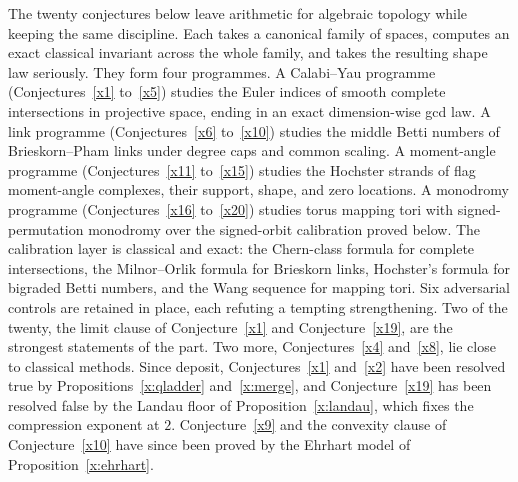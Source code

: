 \documentclass[11pt]{article}
\theoremstyle{definition}
\begin{document}
The twenty conjectures below leave arithmetic for algebraic topology while keeping the same discipline.  Each takes a canonical family of spaces, computes an exact classical invariant across the whole family, and takes the resulting shape law seriously.  They form four programmes.  A Calabi--Yau programme (Conjectures~\ref{x1} to~\ref{x5}) studies the Euler indices of smooth complete intersections in projective space, ending in an exact dimension-wise gcd law.  A link programme (Conjectures~\ref{x6} to~\ref{x10}) studies the middle Betti numbers of Brieskorn--Pham links under degree caps and common scaling.  A moment-angle programme (Conjectures~\ref{x11} to~\ref{x15}) studies the Hochster strands of flag moment-angle complexes, their support, shape, and zero locations.  A monodromy programme (Conjectures~\ref{x16} to~\ref{x20}) studies torus mapping tori with signed-permutation monodromy over the signed-orbit calibration proved below.  The calibration layer is classical and exact: the Chern-class formula for complete intersections, the Milnor--Orlik formula for Brieskorn links, Hochster's formula for bigraded Betti numbers, and the Wang sequence for mapping tori.  Six adversarial controls are retained in place, each refuting a tempting strengthening.  Two of the twenty, the limit clause of Conjecture~\ref{x1} and Conjecture~\ref{x19}, are the strongest statements of the part.  Two more, Conjectures~\ref{x4} and~\ref{x8}, lie close to classical methods.  Since deposit, Conjectures~\ref{x1} and~\ref{x2} have been resolved true by Propositions~\ref{x:qladder} and~\ref{x:merge}, and Conjecture~\ref{x19} has been resolved false by the Landau floor of Proposition~\ref{x:landau}, which fixes the compression exponent at $2$.  Conjecture~\ref{x9} and the convexity clause of Conjecture~\ref{x10} have since been proved by the Ehrhart model of Proposition~\ref{x:ehrhart}.
\end{document}

